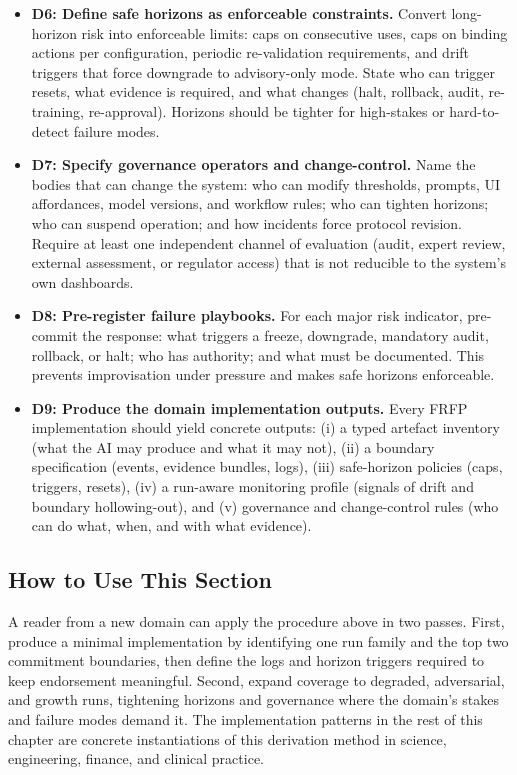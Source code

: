 \begin{itemize}
  \item \textbf{D6: Define safe horizons as enforceable constraints.}
        Convert long-horizon risk into enforceable limits: caps on consecutive uses, caps on binding
        actions per configuration, periodic re-validation requirements, and drift triggers that force
        downgrade to advisory-only mode. State who can trigger resets, what evidence is required, and
        what changes (halt, rollback, audit, re-training, re-approval). Horizons should be tighter for
        high-stakes or hard-to-detect failure modes.

  \item \textbf{D7: Specify governance operators and change-control.}
        Name the bodies that can change the system: who can modify thresholds, prompts, UI affordances,
        model versions, and workflow rules; who can tighten horizons; who can suspend operation; and how
        incidents force protocol revision. Require at least one independent channel of evaluation
        (audit, expert review, external assessment, or regulator access) that is not reducible to the
        system’s own dashboards.

  \item \textbf{D8: Pre-register failure playbooks.}
        For each major risk indicator, pre-commit the response: what triggers a freeze, downgrade,
        mandatory audit, rollback, or halt; who has authority; and what must be documented. This prevents
        improvisation under pressure and makes safe horizons enforceable.

  \item \textbf{D9: Produce the domain implementation outputs.}
        Every FRFP implementation should yield concrete outputs:
        (i) a typed artefact inventory (what the AI may produce and what it may not),
        (ii) a boundary specification (events, evidence bundles, logs),
        (iii) safe-horizon policies (caps, triggers, resets),
        (iv) a run-aware monitoring profile (signals of drift and boundary hollowing-out),
        and (v) governance and change-control rules (who can do what, when, and with what evidence).
\end{itemize}

\subsection{How to Use This Section}

A reader from a new domain can apply the procedure above in two passes. First, produce a minimal
implementation by identifying one run family and the top two commitment boundaries, then define the
logs and horizon triggers required to keep endorsement meaningful. Second, expand coverage to degraded,
adversarial, and growth runs, tightening horizons and governance where the domain’s stakes and failure
modes demand it. The implementation patterns in the rest of this chapter are concrete instantiations
of this derivation method in science, engineering, finance, and clinical practice.

